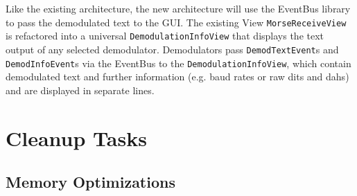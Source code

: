 Like the existing architecture, the new architecture will use the EventBus
library to pass the demodulated text to the \ac{GUI}. The existing View
\texttt{MorseReceiveView} is refactored into a universal
\texttt{De\-mo\-du\-la\-tion\-In\-fo\-View} that displays the text output of any selected 
demodulator. Demodulators pass \texttt{DemodTextEvent}s and 
\texttt{DemodInfoEvent}s via the EventBus to the \texttt{De\-mo\-du\-la\-tion\-In\-fo\-View}, 
which contain demodulated text and further information (e.g. baud rates or raw 
dits and dahs) and are displayed in separate lines.



\section{Cleanup Tasks\label{sec:cleanup}}

\subsection{Memory Optimizations\label{sec:cleanup.mem}}


%
